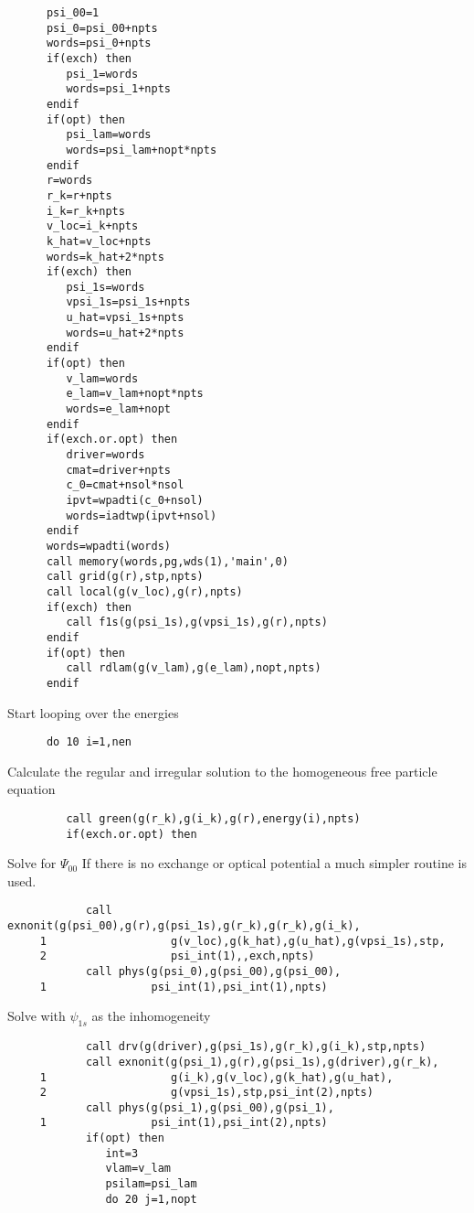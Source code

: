 \documentclass{article}
\begin{document}
\begin{verbatim}
      psi_00=1
      psi_0=psi_00+npts
      words=psi_0+npts
      if(exch) then
         psi_1=words
         words=psi_1+npts
      endif
      if(opt) then
         psi_lam=words
         words=psi_lam+nopt*npts
      endif
      r=words
      r_k=r+npts
      i_k=r_k+npts
      v_loc=i_k+npts
      k_hat=v_loc+npts
      words=k_hat+2*npts
      if(exch) then
         psi_1s=words
         vpsi_1s=psi_1s+npts
         u_hat=vpsi_1s+npts
         words=u_hat+2*npts
      endif
      if(opt) then
         v_lam=words
         e_lam=v_lam+nopt*npts
         words=e_lam+nopt
      endif
      if(exch.or.opt) then
         driver=words
         cmat=driver+npts
         c_0=cmat+nsol*nsol
         ipvt=wpadti(c_0+nsol)
         words=iadtwp(ipvt+nsol)
      endif
      words=wpadti(words)
      call memory(words,pg,wds(1),'main',0)
      call grid(g(r),stp,npts)
      call local(g(v_loc),g(r),npts)
      if(exch) then
         call f1s(g(psi_1s),g(vpsi_1s),g(r),npts)
      endif
      if(opt) then
         call rdlam(g(v_lam),g(e_lam),nopt,npts)
      endif
\end{verbatim}
     Start looping over the energies
\begin{verbatim}
      do 10 i=1,nen
\end{verbatim}
        Calculate the regular and irregular solution to the
        homogeneous free particle equation
\begin{verbatim}
         call green(g(r_k),g(i_k),g(r),energy(i),npts)
         if(exch.or.opt) then
\end{verbatim}
           Solve for $\Psi_{00}$  If there is no exchange or optical
           potential a much simpler routine is used.
\begin{verbatim}
            call exnonit(g(psi_00),g(r),g(psi_1s),g(r_k),g(r_k),g(i_k),
     1                   g(v_loc),g(k_hat),g(u_hat),g(vpsi_1s),stp,
     2                   psi_int(1),,exch,npts)
            call phys(g(psi_0),g(psi_00),g(psi_00),
     1                psi_int(1),psi_int(1),npts)
\end{verbatim}
           Solve with $\psi_{1s}$ as the inhomogeneity
\begin{verbatim}
            call drv(g(driver),g(psi_1s),g(r_k),g(i_k),stp,npts)
            call exnonit(g(psi_1),g(r),g(psi_1s),g(driver),g(r_k),
     1                   g(i_k),g(v_loc),g(k_hat),g(u_hat),
     2                   g(vpsi_1s),stp,psi_int(2),npts)
            call phys(g(psi_1),g(psi_00),g(psi_1),
     1                psi_int(1),psi_int(2),npts)
            if(opt) then
               int=3
               vlam=v_lam
               psilam=psi_lam
               do 20 j=1,nopt
\end{verbatim}
\end{document}
